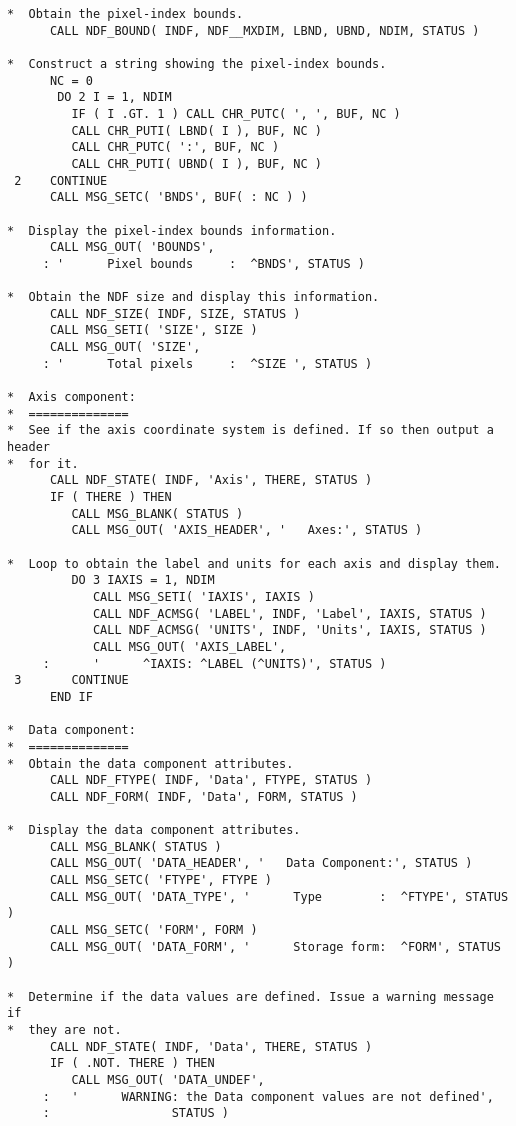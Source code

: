 \documentclass[twoside,11pt]{article}
\begin{document}
\begin{verbatim}
*  Obtain the pixel-index bounds.
      CALL NDF_BOUND( INDF, NDF__MXDIM, LBND, UBND, NDIM, STATUS )

*  Construct a string showing the pixel-index bounds.
      NC = 0
       DO 2 I = 1, NDIM
         IF ( I .GT. 1 ) CALL CHR_PUTC( ', ', BUF, NC )
         CALL CHR_PUTI( LBND( I ), BUF, NC )
         CALL CHR_PUTC( ':', BUF, NC )
         CALL CHR_PUTI( UBND( I ), BUF, NC )
 2    CONTINUE
      CALL MSG_SETC( 'BNDS', BUF( : NC ) )

*  Display the pixel-index bounds information.
      CALL MSG_OUT( 'BOUNDS',
     : '      Pixel bounds     :  ^BNDS', STATUS )

*  Obtain the NDF size and display this information.
      CALL NDF_SIZE( INDF, SIZE, STATUS )
      CALL MSG_SETI( 'SIZE', SIZE )
      CALL MSG_OUT( 'SIZE',
     : '      Total pixels     :  ^SIZE ', STATUS )

*  Axis component:
*  ==============
*  See if the axis coordinate system is defined. If so then output a header
*  for it.
      CALL NDF_STATE( INDF, 'Axis', THERE, STATUS )
      IF ( THERE ) THEN
         CALL MSG_BLANK( STATUS )
         CALL MSG_OUT( 'AXIS_HEADER', '   Axes:', STATUS )

*  Loop to obtain the label and units for each axis and display them.
         DO 3 IAXIS = 1, NDIM
            CALL MSG_SETI( 'IAXIS', IAXIS )
            CALL NDF_ACMSG( 'LABEL', INDF, 'Label', IAXIS, STATUS )
            CALL NDF_ACMSG( 'UNITS', INDF, 'Units', IAXIS, STATUS )
            CALL MSG_OUT( 'AXIS_LABEL',
     :      '      ^IAXIS: ^LABEL (^UNITS)', STATUS )
 3       CONTINUE
      END IF

*  Data component:
*  ==============
*  Obtain the data component attributes.
      CALL NDF_FTYPE( INDF, 'Data', FTYPE, STATUS )
      CALL NDF_FORM( INDF, 'Data', FORM, STATUS )

*  Display the data component attributes.
      CALL MSG_BLANK( STATUS )
      CALL MSG_OUT( 'DATA_HEADER', '   Data Component:', STATUS )
      CALL MSG_SETC( 'FTYPE', FTYPE )
      CALL MSG_OUT( 'DATA_TYPE', '      Type        :  ^FTYPE', STATUS )
      CALL MSG_SETC( 'FORM', FORM )
      CALL MSG_OUT( 'DATA_FORM', '      Storage form:  ^FORM', STATUS )

*  Determine if the data values are defined. Issue a warning message if
*  they are not.
      CALL NDF_STATE( INDF, 'Data', THERE, STATUS )
      IF ( .NOT. THERE ) THEN
         CALL MSG_OUT( 'DATA_UNDEF',
     :   '      WARNING: the Data component values are not defined',
     :                 STATUS )


\end{verbatim}
\end{document}
